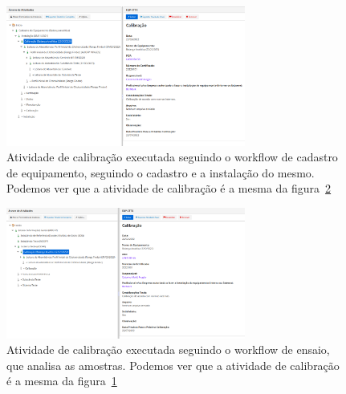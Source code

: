 \begin{figure}
    \centering
    \includegraphics[width=0.7\textwidth]{imgs/CTTX-EQP/cttx_executado_calibracao_equipamento.png}
    \caption{Atividade de calibração executada seguindo o workflow de cadastro de equipamento, seguindo o cadastro e a instalação do mesmo. Podemos ver que a atividade de calibração é a mesma da figura~\ref{fig:cttx_executado_calibracao_leitura_absorbancia}}
    \label{fig:cttx_executado_calibracao_equipamento}
\end{figure}

\begin{figure}
    \centering
    \includegraphics[width=0.7\textwidth]{imgs/CTTX-EQP/cttx_executado_calibracao_ensaio.png}
    \caption{Atividade de calibração executada seguindo o workflow de ensaio, que analisa as amostras. Podemos ver que a atividade de calibração é a mesma da figura~\ref{fig:cttx_executado_calibracao_equipamento}}
    \label{fig:cttx_executado_calibracao_leitura_absorbancia}
\end{figure}